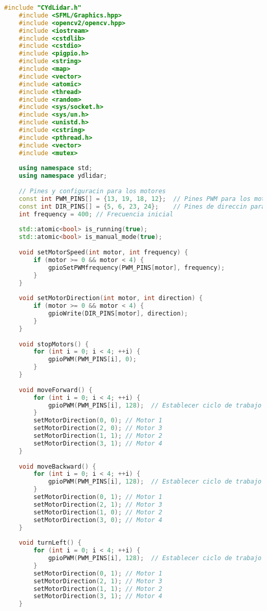 \begin{lstlisting}[language={C++}, caption={Primer ajuste de c\'odigo}, label={Script}]
    #include "CYdLidar.h"
    #include <SFML/Graphics.hpp>
    #include <opencv2/opencv.hpp>
    #include <iostream>
    #include <cstdlib>
    #include <cstdio>
    #include <pigpio.h>
    #include <string>
    #include <map>
    #include <vector>
    #include <atomic>
    #include <thread>
    #include <random>
    #include <sys/socket.h>
    #include <sys/un.h>
    #include <unistd.h>
    #include <cstring>
    #include <pthread.h>
    #include <vector>
    #include <mutex>
    
    using namespace std;
    using namespace ydlidar;
    
    // Pines y configuracin para los motores
    const int PWM_PINS[] = {13, 19, 18, 12};  // Pines PWM para los motores
    const int DIR_PINS[] = {5, 6, 23, 24};    // Pines de direccin para los motores
    int frequency = 400; // Frecuencia inicial
    
    std::atomic<bool> is_running(true);
    std::atomic<bool> is_manual_mode(true);
    
    void setMotorSpeed(int motor, int frequency) {
        if (motor >= 0 && motor < 4) {
            gpioSetPWMfrequency(PWM_PINS[motor], frequency);
        }
    }
    
    void setMotorDirection(int motor, int direction) {
        if (motor >= 0 && motor < 4) {
            gpioWrite(DIR_PINS[motor], direction);
        }
    }
    
    void stopMotors() {
        for (int i = 0; i < 4; ++i) {
            gpioPWM(PWM_PINS[i], 0);
        }
    }
    
    void moveForward() {
        for (int i = 0; i < 4; ++i) {
            gpioPWM(PWM_PINS[i], 128);  // Establecer ciclo de trabajo al 50%
        }
        setMotorDirection(0, 0); // Motor 1
        setMotorDirection(2, 0); // Motor 3
        setMotorDirection(1, 1); // Motor 2
        setMotorDirection(3, 1); // Motor 4
    }
    
    void moveBackward() {
        for (int i = 0; i < 4; ++i) {
            gpioPWM(PWM_PINS[i], 128);  // Establecer ciclo de trabajo al 50%
        }
        setMotorDirection(0, 1); // Motor 1
        setMotorDirection(2, 1); // Motor 3
        setMotorDirection(1, 0); // Motor 2
        setMotorDirection(3, 0); // Motor 4
    }
    
    void turnLeft() {
        for (int i = 0; i < 4; ++i) {
            gpioPWM(PWM_PINS[i], 128);  // Establecer ciclo de trabajo al 50%
        }
        setMotorDirection(0, 1); // Motor 1
        setMotorDirection(2, 1); // Motor 3
        setMotorDirection(1, 1); // Motor 2
        setMotorDirection(3, 1); // Motor 4
    }
    

\end{lstlisting}
